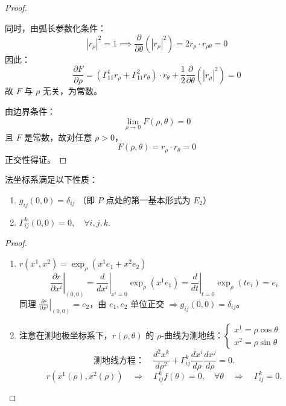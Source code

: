 \documentclass[lang=cn,10pt,thmcnt=section]{elegantbook}
\begin{document}
\begin{proof}
\begin{enumerate}
    同时，由弧长参数化条件：
    \[
    |r_\rho|^2 = 1 \implies \frac{\partial}{\partial \theta} (|r_\rho|^2) = 2 r_\rho \cdot r_{\rho\theta} = 0
    \]
    因此：
    \[
    \frac{\partial F}{\partial \rho} = (\Gamma_{11}^1 r_\rho + \Gamma_{11}^2 r_\theta) \cdot r_\theta + \frac{1}{2} \frac{\partial}{\partial \theta} (|r_\rho|^2) = 0
    \]
    故 \( F \) 与 \(\rho\) 无关，为常数。
\end{enumerate}

由边界条件：
\[
\lim_{\rho \to 0} F(\rho, \theta) = 0
\]
且 \( F \) 是常数，故对任意 \(\rho > 0\)，
\[
F(\rho, \theta) = r_\rho \cdot r_\theta = 0
\]
正交性得证。
\end{proof}
\begin{proposition}
    法坐标系满足以下性质：
\begin{enumerate}
    \item \( g_{ij}(0,0) = \delta_{ij} \) \quad （即 \( P \) 点处的第一基本形式为 \( E_2 \)）
    \item \( \Gamma^k_{ij}(0,0) = 0, \quad \forall i,j,k \).
\end{enumerate}
\end{proposition}
\begin{proof}
    \begin{enumerate}
        \item \( r(x^1, x^2) = \exp_{\rho}(x^1 e_1 + x^2 e_2) \)
        \[
        \left. \frac{\partial r}{\partial x^i} \right|_{(0,0)} = \left. \frac{d}{dx^i} \right|_{x^i=0} \exp_{\rho}(x^1 e_1) = \left. \frac{d}{dt} \right|_{t=0} \exp_{\rho}(t e_i) = e_i
        \]
        同理 \(\left. \frac{\partial r}{\partial x^2} \right|_{(0,0)} = e_2\)，由 \(e_1, e_2\) 单位正交 \(\Rightarrow g_{ij}(0,0) = \delta_{ij}\)。
        \item 注意在测地极坐标系下，\(r(\rho, \theta)\) 的 \(\rho\)-曲线为测地线：$ \left\{
            \begin{array}{l}
            x^1 = \rho \cos \theta \\
            x^2 = \rho \sin \theta
            \end{array}
            \right.$
        \[
        \text{测地线方程：} \quad \frac{d^2 x^k}{d\rho^2} + \Gamma^k_{ij} \frac{dx^i}{d\rho} \frac{dx^j}{d\rho} = 0.
        \]
        \[
        r(x^1(\rho), x^2(\rho)) \quad \Rightarrow \quad \Gamma^k_{ij} f(\theta) = 0, \quad \forall \theta \quad \Rightarrow \quad \Gamma^k_{ij} = 0.
        \]
       
    \end{enumerate}
    
\end{proof}
\end{document}
